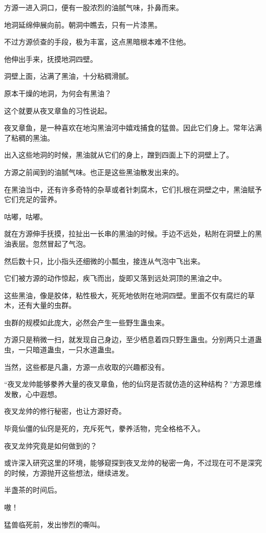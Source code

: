 \begin{this_body}
方源一进入洞口，便有一股浓烈的油腻气味，扑鼻而来。

地洞延绵伸展向前。朝洞中瞧去，只有一片漆黑。

不过方源侦查的手段，极为丰富，这点黑暗根本难不住他。

他伸出手来，抚摸地洞四壁。

洞壁上面，沾满了黑油，十分粘稠滑腻。

原本干燥的地洞，为何会有黑油？

这个就要从夜叉章鱼的习性说起。

夜叉章鱼，是一种喜欢在地沟黑油河中嬉戏捕食的猛兽。因此它们身上。常年沾满了粘稠的黑油。

出入这些地洞的时候，黑油就从它们的身上，蹭到四面上下的洞壁上了。

方源之前闻到的油腻气味。也正是这些黑油散发出来的。

在黑油当中，还有许多奇特的杂草或者针刺腐木，它们扎根在洞壁之中，黑油赋予它们充足的营养。

咕嘟，咕嘟。

就在方源伸手抚摸，拉扯出一长串的黑油的时候。手边不远处，粘附在洞壁上的黑油表层。忽然冒起了气泡。

然后数十只，比小指头还细微的小瓢虫，接连从气泡中飞出来。

它们被方源的动作惊起，疾飞而出，旋即又落到远处洞顶的黑油之中。

这些黑油，像是胶体，粘性极大，死死地依附在地洞四壁。里面不仅有腐烂的草木，还有大量的虫群。

虫群的规模如此庞大，必然会产生一些野生蛊虫来。

方源只是稍微一扫，就发现自己身边，至少栖息着四只野生蛊虫。分别两只土道蛊虫，一只暗道蛊虫，一只水道蛊虫。

当然，这些都是凡蛊，方源一点收取的兴趣都没有。

“夜叉龙帅能够豢养大量的夜叉章鱼，他的仙窍是否就仿造的这种结构？”方源思维发散，心中遐想。

夜叉龙帅的修行秘密，也让方源好奇。

毕竟仙僵的仙窍是死的，充斥死气，豢养活物，完全格格不入。

夜叉龙帅究竟是如何做到的？

或许深入研究这里的环境，能够窥探到夜叉龙帅的秘密一角，不过现在可不是深究的时候，方源抛开这些想法，继续进发。

半盏茶的时间后。

嗷！

猛兽临死前，发出惨烈的嘶叫。


\end{this_body}
